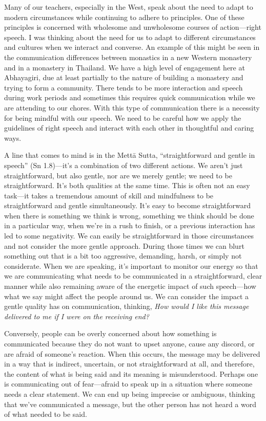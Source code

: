 Many of our teachers, especially in the West, speak about the need to 
adapt to modern circumstances while continuing to adhere to principles. 
One of these principles is concerned with wholesome and unwholesome 
courses of action---right speech. I was thinking about the need for us 
to adapt to different circumstances and cultures when we interact and 
converse. An example of this might be seen in the communication 
differences between monastics in a new Western monastery and in a 
monastery in Thailand. We have a high level of engagement here at 
Abhayagiri, due at least partially to the nature of building a 
monastery and trying to form a community. There tends to be more 
interaction and speech during work periods and sometimes this requires 
quick communication while we are attending to our chores. With this 
type of communication there is a necessity for being mindful with our 
speech. We need to be careful how we apply the guidelines of right 
speech and interact with each other in thoughtful and caring ways.

A line that comes to mind is in the Mettā Sutta, ``straightforward and 
gentle in speech'' (Sn 1.8)---it's a combination of two different 
actions. We aren't just straightforward, but also gentle, nor are we 
merely gentle; we need to be straightforward. It's both qualities at 
the same time. This is often not an easy task---it takes a tremendous 
amount of skill and mindfulness to be straightforward and gentle 
simultaneously. It's easy to become straightforward when there is 
something we think is wrong, something we think should be done in a 
particular way, when we're in a rush to finish, or a previous 
interaction has led to some negativity. We can easily be 
straightforward in those circumstances and not consider the more gentle 
approach. During those times we can blurt something out that is a bit 
too aggressive, demanding, harsh, or simply not considerate. When we 
are speaking, it's important to monitor our energy so that we are 
communicating what needs to be communicated in a straightforward, clear 
manner while also remaining aware of the energetic impact of such 
speech---how what we say might affect the people around us. We can 
consider the impact a gentle quality has on communication, thinking, 
\emph{How would I like this message delivered to me if I were on the 
receiving end?}

Conversely, people can be overly concerned about how something is 
communicated because they do not want to upset anyone, cause any 
discord, or are afraid of someone's reaction. When this occurs, the 
message may be delivered in a way that is indirect, uncertain, or not 
straightforward at all, and therefore, the content of what is being 
said and its meaning is misunderstood. Perhaps one is communicating out 
of fear---afraid to speak up in a situation where someone needs a clear 
statement. We can end up being imprecise or ambiguous, thinking that 
we've communicated a message, but the other person has not heard a word 
of what needed to be said.

